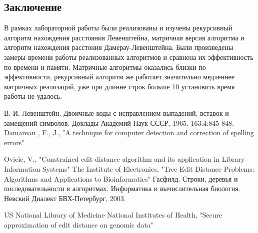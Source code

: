 \documentclass[a4paper,12pt]{article}
\begin{document}
    \newpage

    \begin{center}
        \section*{Заключение}
    \end{center}
            \label{sec:ending}
        	\qquad В рамках лабораторной работы были реализованы и изучены рекурсивный алгоритм нахождения расстояния Левенштейна, матричная версия алгоритма и алгоритм нахождения расстония Дамерау-Левенштейна. Были произведены замеры времени работы реализованных алгоритмов и сравнена их эффективность по времени и памяти. Матричные алгоритмы оказались близки по эффективности, рекурсивный алгоритм же работает значительно медленнее матричных реализаций, уже при длинне строк больше 10 установить время работы не удалось.

    \newpage

    \begin{center}        
        \begin{thebibliography}{}
        	  В. И. Левенштейн. Двоичные коды с исправлением выпадений, вставок и замещений символов. Доклады Академий Наук СССР, 1965. 163.4:845-848.
        	  Damareau , F., J., "A technique for computer detection and correction of spelling errors"
			
        	
        	  Ovicic, V., "Constrained edit distance algorithm and its application in Library Information Systems"           
			  The Institute of Electronics, "Tree Edit Distance Problems: Algorithms and Applications to Bioinformatics"
        	  Гасфилд. Строки, деревья и последовательности в алгоритмах. Информатика и вычислительная биология. Невский Диалект БВХ-Петербург, 2003.
        	        	
        		US National Library of Medicine National Institutes of Health, "Secure approximation of edit distance on genomic data"
        	 	
        	
        \end{thebibliography}
    \end{center}
\end{document}
